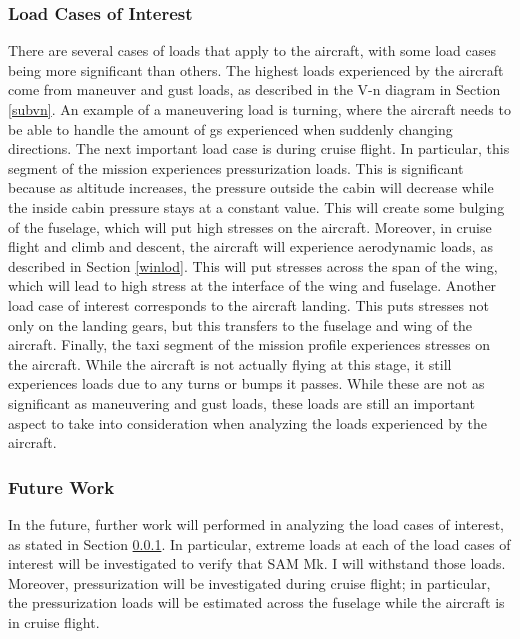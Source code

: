 \subsubsection{Load Cases of Interest}
\label{lcoi}
There are several cases of loads that apply to the aircraft, with some load cases being more significant than others. The highest loads experienced by the aircraft come from maneuver and gust loads, as described in the V-n diagram in Section \ref{subvn}. An example of a maneuvering load is turning, where the aircraft needs to be able to handle the amount of gs experienced when suddenly changing directions. The next important load case is during cruise flight. In particular, this segment of the mission experiences pressurization loads. This is significant because as altitude increases, the pressure outside the cabin will decrease while the inside cabin pressure stays at a constant value. This will create some bulging of the fuselage, which will put high stresses on the aircraft. Moreover, in cruise flight and climb and descent, the aircraft will experience aerodynamic loads, as described in Section \ref{winlod}. This will put stresses across the span of the wing, which will lead to high stress at the interface of the wing and fuselage. Another load case of interest corresponds to the aircraft landing. This puts stresses not only on the landing gears, but this transfers to the fuselage and wing of the aircraft. Finally, the taxi segment of the mission profile experiences stresses on the aircraft. While the aircraft is not actually flying at this stage, it still experiences loads due to any turns or bumps it passes. While these are not as significant as maneuvering and gust loads, these loads are still an important aspect to take into consideration when analyzing the loads experienced by the aircraft.

\subsubsection{Future Work}
In the future, further work will performed in analyzing the load cases of interest, as stated in Section \ref{lcoi}. In particular, extreme loads at each of the load cases of interest will be investigated to verify that SAM Mk. I will withstand those loads. Moreover, pressurization will be investigated during cruise flight; in particular, the pressurization loads will be estimated across the fuselage while the aircraft is in cruise flight. 

